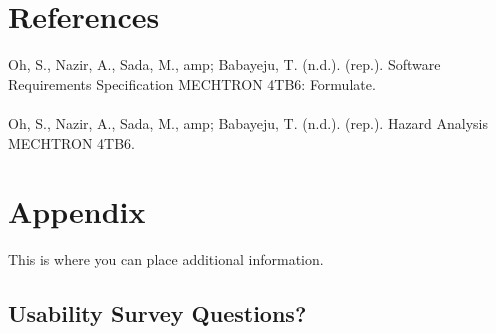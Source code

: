 \documentclass[12pt, titlepage]{article}
\begin{document}

  \newpage




				

\section{References}
Oh, S., Nazir, A., Sada, M., amp; Babayeju, T. (n.d.). (rep.). Software Requirements Specification MECHTRON 4TB6: Formulate. \\
\noindent \\
Oh, S., Nazir, A., Sada, M., amp; Babayeju, T. (n.d.). (rep.). Hazard Analysis MECHTRON 4TB6. \\


\section{Appendix}

This is where you can place additional information.

\subsection{Usability Survey Questions?}

\end{document}
